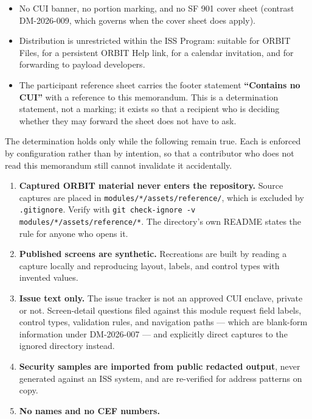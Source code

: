 {\begin{enumerate}
\begin{itemize}
    \item No CUI banner, no portion marking, and no SF 901 cover sheet (contrast DM-2026-009, which governs when the cover sheet does apply).
    \item Distribution is unrestricted within the ISS Program: suitable for ORBIT Files, for a persistent ORBIT Help link, for a calendar invitation, and for forwarding to payload developers.
    \item The participant reference sheet carries the footer statement \textbf{``Contains no CUI''} with a reference to this memorandum. This is a determination statement, not a marking; it exists so that a recipient who is deciding whether they may forward the sheet does not have to ask.
\end{itemize}


The determination holds only while the following remain true. Each is enforced by configuration rather than by intention, so that a contributor who does not read this memorandum still cannot invalidate it accidentally.

\begin{enumerate}
    \item \textbf{Captured ORBIT material never enters the repository.} Source captures are placed in \texttt{modules/*/assets/reference/}, which is excluded by \texttt{.gitignore}. Verify with \texttt{git check-ignore -v modules/*/assets/reference/*}. The directory's own README states the rule for anyone who opens it.
    \item \textbf{Published screens are synthetic.} Recreations are built by reading a capture locally and reproducing layout, labels, and control types with invented values.
    \item \textbf{Issue text only.} The issue tracker is not an approved CUI enclave, private or not. Screen-detail questions filed against this module request field labels, control types, validation rules, and navigation paths --- which are blank-form information under DM-2026-007 --- and explicitly direct captures to the ignored directory instead.
    \item \textbf{Security samples are imported from public redacted output}, never generated against an ISS system, and are re-verified for address patterns on copy.
    \item \textbf{No names and no CEF numbers.}
\end{enumerate}


\end{enumerate}}
